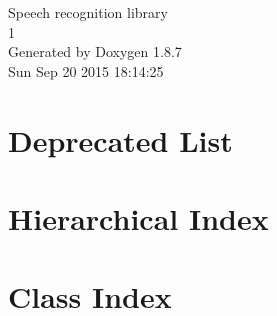 \documentclass[twoside]{book}
\newcommand{\+}{\discretionary{\mbox{\scriptsize$\hookleftarrow$}}{}{}}
\newcommand{\clearemptydoublepage}{%
  \newpage{\pagestyle{empty}\cleardoublepage}%
}
\begin{document}
\hypersetup{pageanchor=false,
             bookmarks=true,
             bookmarksnumbered=true,
             pdfencoding=unicode
            }
\begin{titlepage}
\vspace*{7cm}
\begin{center}%
{\Large Speech recognition library \\[1ex]\large 1 }\\
\vspace*{1cm}
{\large Generated by Doxygen 1.8.7}\\
\vspace*{0.5cm}
{\small Sun Sep 20 2015 18:14:25}\\
\end{center}
\end{titlepage}
\clearemptydoublepage
\tableofcontents
\clearemptydoublepage
{}
\hypersetup{pageanchor=true}

\chapter{Deprecated List}
\label{deprecated}
\hypertarget{deprecated}{}

\chapter{Hierarchical Index}

\chapter{Class Index}

\end{document}
